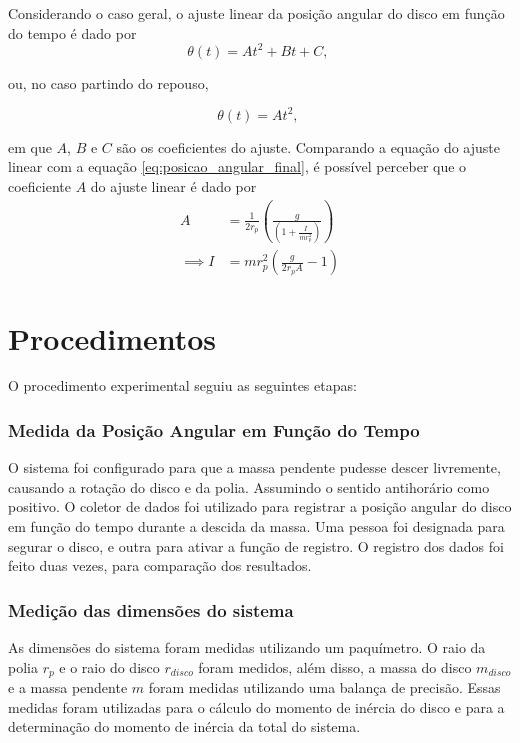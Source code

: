 \documentclass[12pt,a4paper]{article}
\begin{document}
Considerando o caso geral, o ajuste linear da posição angular do disco em função do tempo é dado por
\begin{equation}
    \theta(t) = A t^2 + B t + C,~\label{eq:angular_position_geral}
\end{equation}

ou, no caso partindo do repouso,

\begin{equation}
    \theta(t) = A t^2,~\label{eq:angular_position_repouso}
\end{equation}

em que $A$, $B$ e $C$ são os coeficientes do ajuste. Comparando a equação do ajuste linear com a equação \eqref{eq:posicao_angular_final}, é possível perceber que o coeficiente $A$ do ajuste linear é dado por
\begin{align}
    A &= \frac{1}{2r_p} \left(\frac{g}{\left(1 + \frac{I}{mr_p^2}\right)}\right) \nonumber \\
    \implies I &= mr_p^2 \left(\frac{g}{2r_p A} - 1\right) \label{eq:moment_inertia_final}
\end{align}

\section{Procedimentos}

O procedimento experimental seguiu as seguintes etapas:

\subsubsection{Medida da Posição Angular em Função do Tempo}
O sistema foi configurado para que a massa pendente pudesse descer livremente, causando a rotação do disco e da polia. Assumindo o sentido antihorário como positivo. O coletor de dados foi utilizado para registrar a posição angular do disco em função do tempo durante a descida da massa. Uma pessoa foi designada para segurar o disco, e outra para ativar a função de registro. O registro dos dados foi feito duas vezes, para comparação dos resultados.

\subsubsection{Medição das dimensões do sistema}
As dimensões do sistema foram medidas utilizando um paquímetro. O raio da polia $r_p$ e o raio do disco $r_{disco}$ foram medidos, além disso, a massa do disco $m_{disco}$ e a massa pendente $m$ foram medidas utilizando uma balança de precisão. Essas medidas foram utilizadas para o cálculo do momento de inércia do disco e para a determinação do momento de inércia da total do sistema.
\end{document}
